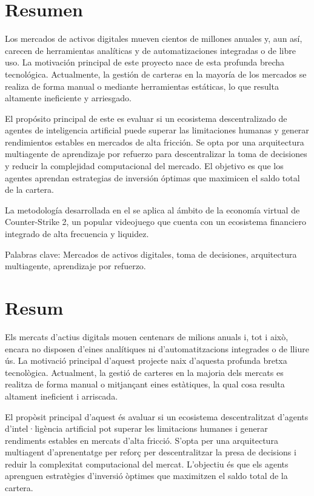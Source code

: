 \chapter*{Resumen}

Los mercados de activos digitales mueven cientos de millones anuales y, aun así, carecen de herramientas analíticas y de automatizaciones integradas o de libre uso. La motivación principal de este proyecto nace de esta profunda brecha tecnológica. Actualmente, la gestión de carteras en la mayoría de los mercados se realiza de forma manual o mediante herramientas estáticas, lo que resulta altamente ineficiente y arriesgado.

El propósito principal de este  es evaluar si un ecosistema descentralizado de agentes de inteligencia artificial puede superar las limitaciones humanas y generar rendimientos estables en mercados de alta fricción. Se opta por una arquitectura multiagente de aprendizaje por refuerzo para descentralizar la toma de decisiones y reducir la complejidad computacional del mercado. El objetivo es que los agentes aprendan estrategias de inversión óptimas que maximicen el saldo total de la cartera.

La metodología desarrollada en el  se aplica al ámbito de la economía virtual de Counter-Strike 2, un popular videojuego que cuenta con un ecosistema financiero integrado de alta frecuencia y liquidez.

Palabras clave: Mercados de activos digitales, toma de decisiones, arquitectura multiagente, aprendizaje por refuerzo.

\chapter*{Resum}

Els mercats d'actius digitals mouen centenars de milions anuals i, tot i això, encara no disposen d'eines analítiques ni d'automatitzacions integrades o de lliure ús. La motivació principal d'aquest projecte naix d'aquesta profunda bretxa tecnològica. Actualment, la gestió de carteres en la majoria dels mercats es realitza de forma manual o mitjançant eines estàtiques, la qual cosa resulta altament ineficient i arriscada.

El propòsit principal d'aquest  és avaluar si un ecosistema descentralitzat d'agents d'intel·ligència artificial pot superar les limitacions humanes i generar rendiments estables en mercats d'alta fricció. S'opta per una arquitectura multiagent d'aprenentatge per reforç per descentralitzar la presa de decisions i reduir la complexitat computacional del mercat. L'objectiu és que els agents aprenguen estratègies d'inversió òptimes que maximitzen el saldo total de la cartera.

